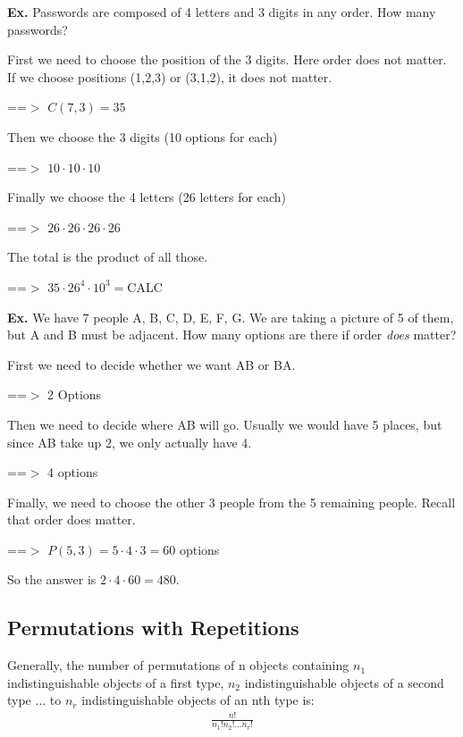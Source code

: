 \documentclass[12pt,letterpaper]{article} \usepackage{amsmath} \usepackage{graphicx}  \usepackage{longtable}  \usepackage{amssymb}
\begin{document}
        \begin{mdframed}
            \textbf{Ex. } Passwords are composed of 4 letters and 3 digits in any order. How many passwords?

            First we need to choose the position of the 3 digits. Here order does not matter. If we choose positions (1,2,3) or (3,1,2), it does not matter. 

            ==$>$ $C(7,3)=35$

            Then we choose the 3 digits (10 options for each)

            ==$>$ $10\cdot 10\cdot 10$

            Finally we choose the 4 letters (26 letters for each)

            ==$>$ $26\cdot 26\cdot 26\cdot 26$

            The total is the product of all those. 

            ==$>$ $35\cdot 26^4 \cdot 10^3 = $CALC
        \end{mdframed}

        \begin{mdframed}
            \textbf{Ex. } We have 7 people A, B, C, D, E, F, G. We are taking a picture of 5 of them, but A and B must be adjacent. How many options are there if order \emph{does} matter?

            First we need to decide whether we want AB or BA. 

            ==$>$ 2 Options

            Then we need to decide where AB will go. Usually we would have 5 places, but since AB take up 2, we only actually have 4. 

            ==$>$ 4 options

            Finally, we need to choose the other 3 people from the 5 remaining people. Recall that order does matter. 

            ==$>$ $P(5,3) = 5\cdot 4\cdot 3 = 60$ options

            So the answer is $2\cdot 4\cdot 60 = 480$.
        \end{mdframed}

        \subsection{Permutations with Repetitions}
        Generally, the number of permutations of n objects containing $n_1$ indistinguishable objects of a first type, $n_2$ indistinguishable objects of a second type ... to $n_r$ indistinguishable objects of an nth type is: 
        \begin{align*}
            \frac{n!}{n_1!n_2!...n_r!}
        \end{align*}
\end{document}
